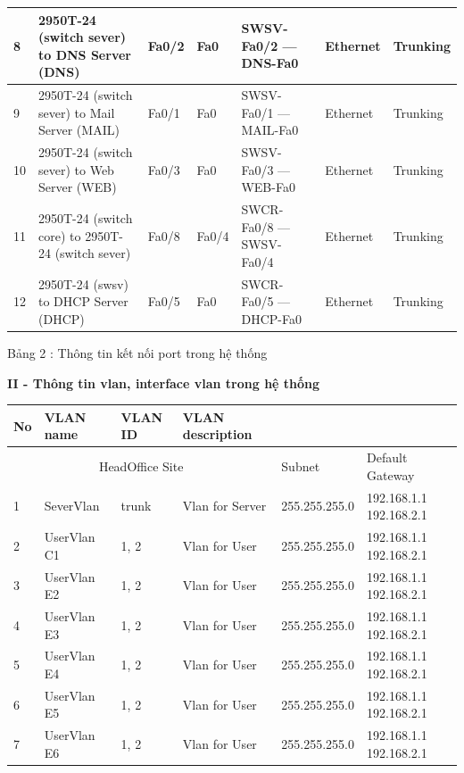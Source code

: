 \documentclass{report}
\begin{document}
\begin{tabular}{|m{0.4cm}|m{2.15cm}|m{1.65cm}|m{2.2cm}|m{2.5cm}|m{1.6cm}|m{2cm}|}
    \hline
	8 & 2950T-24 (switch sever) to DNS Server (DNS) & Fa0/2 & Fa0 & SWSV-Fa0/2 --- DNS-Fa0 & Ethernet & Trunking \\
	\hline
	9 & 2950T-24 (switch sever) to Mail Server (MAIL) & Fa0/1 & Fa0 & SWSV-Fa0/1 --- MAIL-Fa0 & Ethernet & Trunking \\
	\hline
	10 & 2950T-24 (switch sever) to Web Server (WEB) & Fa0/3 & Fa0 & SWSV-Fa0/3 --- WEB-Fa0 & Ethernet & Trunking \\
    \hline
	11 & 2950T-24 (switch core) to 2950T-24 (switch sever) & Fa0/8 & Fa0/4 & SWCR-Fa0/8 --- SWSV-Fa0/4 & Ethernet & Trunking \\
    \hline
    12 & 2950T-24 (swsv) to DHCP Server (DHCP) & Fa0/5 & Fa0 & SWCR-Fa0/5 --- DHCP-Fa0 & Ethernet & Trunking \\
    \hline    
\end{tabular}

\smallskip
\centerline{Bảng 2 : Thông tin kết nối port trong hệ thống}

\newpage
\changefontsizes{14pt}
\textbf{II - Thông tin vlan, interface vlan trong hệ thống}
\smallskip
\changefontsizes{12pt}

\begin{tabular}{|m{0.4cm}|m{2.4cm}|m{1.8cm}|m{3.4cm}|m{2.4cm}|m{2.3cm}|}
	\hline
	No & VLAN name & VLAN ID & VLAN description & \multicolumn{2}{|c|}{}\\
	\hline
	\multicolumn{4}{|c|}{HeadOffice Site} & Subnet & Default Gateway \\
	\hline
   	 1 & SeverVlan & trunk & Vlan for Server & 255.255.255.0 & 192.168.1.1 192.168.2.1 \\
	\hline
	 2 & UserVlan C1 & 1, 2 & Vlan for User & 255.255.255.0 & 192.168.1.1 192.168.2.1 \\
	 \hline
	 3 & UserVlan E2 & 1, 2 & Vlan for User & 255.255.255.0 & 192.168.1.1 192.168.2.1 \\
	 \hline
	 4 & UserVlan E3 & 1, 2 & Vlan for User & 255.255.255.0 & 192.168.1.1 192.168.2.1 \\
	 \hline
     5 & UserVlan E4 & 1, 2 & Vlan for User & 255.255.255.0 & 192.168.1.1 192.168.2.1 \\
     \hline
	 6 & UserVlan E5 & 1, 2 & Vlan for User & 255.255.255.0 & 192.168.1.1 192.168.2.1 \\
	 \hline
  	 7 & UserVlan E6 & 1, 2 & Vlan for User	& 255.255.255.0	& 192.168.1.1 192.168.2.1 \\
  	 \hline
\end{tabular}
\end{document}

